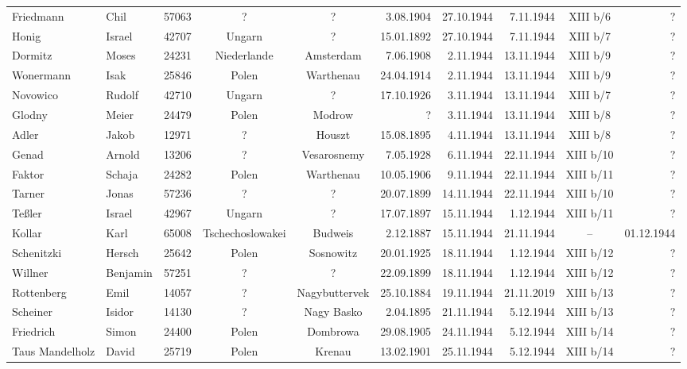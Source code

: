 \documentclass[a4paper,12pt,ngerman,
]{nisebook}
\begin{document}
\begin{tiny}
\begin{longtable}[l]{|l|l|r|c|c|r|r|r|c|r|}
Friedmann  &  Chil  & 57063 &  ?  &  ?  & 3.08.1904 & 27.10.1944 & 7.11.1944 &  XIII b/6  &  ? \\[3pt]
Honig  &  Israel  & 42707 &  Ungarn  &  ?  & 15.01.1892 & 27.10.1944 & 7.11.1944 &  XIII b/7  &  ? \\[3pt]
Dormitz  &  Moses  & 24231 &  Niederlande  &  Amsterdam  & 7.06.1908 & 2.11.1944 & 13.11.1944 &  XIII b/9  &  ? \\[3pt]
Wonermann  &  Isak  & 25846 &  Polen  &  Warthenau  & 24.04.1914 & 2.11.1944 & 13.11.1944 &  XIII b/9  &  ? \\[3pt]
Novowico  &  Rudolf  & 42710 &  Ungarn  &  ?  & 17.10.1926 & 3.11.1944 & 13.11.1944 &  XIII b/7  &  ? \\[3pt]
Glodny  &  Meier  & 24479 &  Polen  &  Modrow  & ?  & 3.11.1944 & 13.11.1944 &  XIII b/8  &  ? \\[3pt]
Adler  &  Jakob  & 12971 &  ?  &  Houszt  & 15.08.1895 & 4.11.1944 & 13.11.1944 &  XIII b/8  &  ? \\[3pt]
Genad  &  Arnold  & 13206 &  ?  &  Vesarosnemy  & 7.05.1928 & 6.11.1944 & 22.11.1944 &  XIII b/10  &  ? \\[3pt]
Faktor  &  Schaja  & 24282 &  Polen  &  Warthenau  & 10.05.1906 & 9.11.1944 & 22.11.1944 &  XIII b/11  &  ? \\[3pt]
Tarner  &  Jonas  & 57236 &  ?  &  ?  & 20.07.1899 & 14.11.1944 & 22.11.1944 &  XIII b/10  &  ? \\[3pt]
Teßler  &  Israel  & 42967 &  Ungarn  &  ?  & 17.07.1897 & 15.11.1944 & 1.12.1944 &  XIII b/11  &  ? \\[3pt]
Kollar  &  Karl  & 65008 &  Tschechoslowakei  &  Budweis  & 2.12.1887 & 15.11.1944 & 21.11.1944 &  --  &  01.12.1944 \\[3pt]
Schenitzki  &  Hersch  & 25642 &  Polen  &  Sosnowitz  & 20.01.1925 & 18.11.1944 & 1.12.1944 &  XIII b/12  &  ? \\[3pt]
Willner  &  Benjamin  & 57251 &  ?  &  ?  & 22.09.1899 & 18.11.1944 & 1.12.1944 &  XIII b/12  &  ? \\[3pt]
Rottenberg  &  Emil  & 14057 &  ?  &  Nagybuttervek  & 25.10.1884 & 19.11.1944 & 21.11.2019 &  XIII b/13  &  ? \\[3pt]
Scheiner  &  Isidor  & 14130 &  ?  &  Nagy Basko  & 2.04.1895 & 21.11.1944 & 5.12.1944 &  XIII b/13  &  ? \\[3pt]
Friedrich  &  Simon  & 24400 &  Polen  &  Dombrowa  & 29.08.1905 & 24.11.1944 & 5.12.1944 &  XIII b/14  &  ? \\[3pt]
Taus Mandelholz  &  David  & 25719 &  Polen  &  Krenau  & 13.02.1901 & 25.11.1944 & 5.12.1944 &  XIII b/14  &  ? \\[3pt]

\end{longtable}
\end{tiny}
\end{document}
